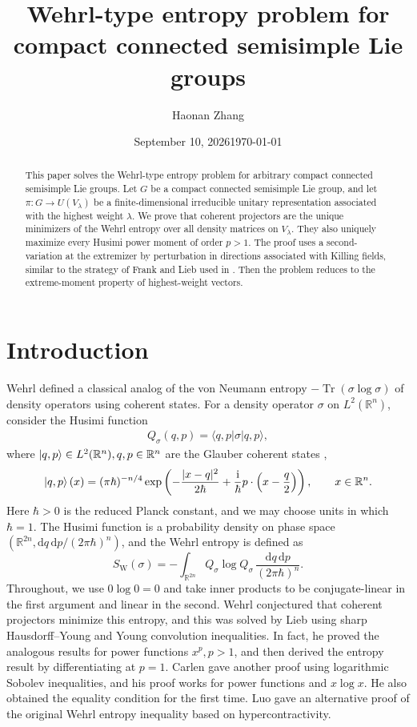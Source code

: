 \documentclass[11pt,reqno]{amsart}
\title[Wehrl-type entropy for compact semisimple groups]{Wehrl-type entropy problem for compact connected semisimple Lie groups}
\date{September 10, 2026}
\author{Haonan Zhang}
\date{\today}
\numberwithin{equation}{section}
\theoremstyle{plain}
\theoremstyle{remark}
\newcommand{\R}{\mathbb R}
\newcommand{\ii}{\mathrm i}
\newcommand{\tr}{\operatorname{Tr}}
\newcommand{\SW}{S_{\mathrm W}}
\begin{document}
\raggedbottom
\begin{abstract}
This paper solves the Wehrl-type entropy problem for arbitrary compact connected semisimple Lie groups.
Let $G$ be a compact connected semisimple Lie group, and let $\pi:G\to U(V_\lambda)$ be a
finite-dimensional irreducible unitary representation associated with the highest weight $\lambda$.
We prove that coherent projectors are the unique minimizers of the Wehrl entropy
over all density matrices on $V_\lambda$. They also uniquely maximize every Husimi power moment of order $p>1$.
The proof uses a second-variation at the extremizer by perturbation in directions associated with Killing fields, similar to the strategy of Frank and Lieb used in \cite{FrankLieb}. Then the problem reduces to the extreme-moment property of highest-weight vectors.

\end{abstract}
\maketitle

\section{Introduction}\label{sec:intro}

Wehrl \cite{Wehrl,Wehrl79} defined a classical analog of the von Neumann entropy
$-\tr(\sigma\log\sigma)$ of density operators using coherent states. For a density operator $\sigma$ on $L^2(\R^n)$, consider the Husimi function
\begin{gather*}
 Q_\sigma(q,p)=\langle q,p|\sigma|q,p\rangle,
\end{gather*}
where $\ket{q,p}\in L^2(\R^n), q,p\in\R^n$ are the Glauber coherent states \cite{Glauber},
\[
 \ket{q,p}(x)=(\pi\hbar)^{-n/4}
 \exp\left(-\frac{|x-q|^2}{2\hbar}
       +\frac{\ii}{\hbar}p\cdot\left(x-\frac q2\right)\right),\qquad x\in \R^n.
       \]
Here $\hbar>0$ is the reduced Planck constant, and we may choose units in which $\hbar=1$. The Husimi function is a probability density on phase space $(\R^{2n},\mathrm d q\,\mathrm d p/(2\pi\hbar)^n)$, and the Wehrl entropy is defined as
\[
 \SW(\sigma)=-\int_{\R^{2n}}Q_\sigma\log Q_\sigma\,
                  \frac{\mathrm d q\,\mathrm d p}{(2\pi\hbar)^n}.
\]
Throughout, we use $0\log0=0$ and take inner products to be conjugate-linear
in the first argument and linear in the second.
Wehrl conjectured \cite{Wehrl79} that coherent
projectors minimize this entropy, and this was solved by Lieb \cite{Lieb}
using sharp Hausdorff--Young and Young convolution inequalities. In fact, he proved the analogous results
 for power functions $x^p, p>1$, and then derived the entropy result by differentiating at $p=1$.
Carlen \cite{Carlen} gave another proof using logarithmic Sobolev inequalities, and his proof works for power functions and $x\log x$.
He also obtained the equality condition for the first time.
Luo \cite{Luo} gave an alternative proof of the original Wehrl entropy inequality based on hypercontractivity.
\end{document}
